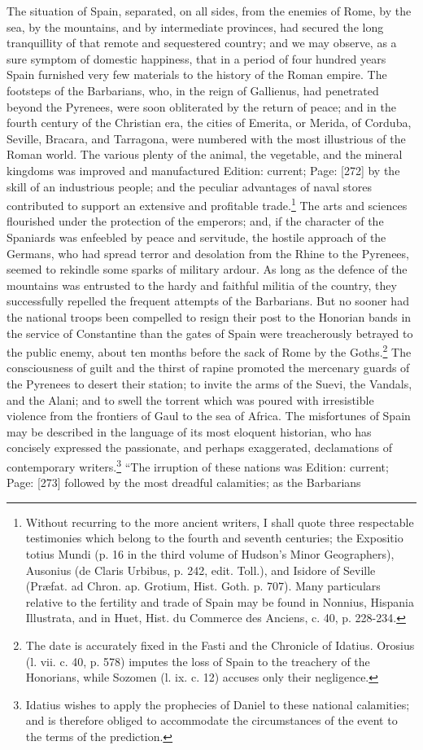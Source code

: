 The situation of Spain, separated, on all sides, from the enemies of Rome, by the sea, by the mountains, and by intermediate provinces, had secured the long tranquillity of that remote and sequestered country; and we may observe, as a sure symptom of domestic happiness, that in a period of four hundred years Spain furnished very few materials to the history of the Roman empire. The footsteps of the Barbarians, who, in the reign of Gallienus, had penetrated beyond the Pyrenees, were soon obliterated by the return of peace; and in the fourth century of the Christian era, the cities of Emerita, or Merida, of Corduba, Seville, Bracara, and Tarragona, were numbered with the most illustrious of the Roman world. The various plenty of the animal, the vegetable, and the mineral kingdoms was improved and manufactured Edition: current; Page: [272] by the skill of an industrious people; and the peculiar advantages of naval stores contributed to support an extensive and profitable trade.\footnote{Without recurring to the more ancient writers, I shall quote three respectable testimonies which belong to the fourth and seventh centuries; the Expositio totius Mundi (p. 16 in the third volume of Hudson\texthebrew{}’s Minor Geographers), Ausonius (de Claris Urbibus, p. 242, edit. Toll.), and Isidore of Seville (Præfat. ad Chron. ap. Grotium, Hist. Goth. p. 707). Many particulars relative to the fertility and trade of Spain may be found in Nonnius, Hispania Illustrata, and in Huet, Hist. du Commerce des Anciens, c. 40, p. 228-234.} The arts and sciences flourished under the protection of the emperors; and, if the character of the Spaniards was enfeebled by peace and servitude, the hostile approach of the Germans, who had spread terror and desolation from the Rhine to the Pyrenees, seemed to rekindle some sparks of military ardour. As long as the defence of the mountains was entrusted to the hardy and faithful militia of the country, they successfully repelled the frequent attempts of the Barbarians. But no sooner had the national troops been compelled to resign their post to the Honorian bands in the service of Constantine than the gates of Spain were treacherously betrayed to the public enemy, about ten months before the sack of Rome by the Goths.\footnote{The date is accurately fixed in the Fasti and the Chronicle of Idatius. Orosius (l. vii. c. 40, p. 578) imputes the loss of Spain to the treachery of the Honorians, while Sozomen (l. ix. c. 12) accuses only their negligence.} The consciousness of guilt and the thirst of rapine promoted the mercenary guards of the Pyrenees to desert their station; to invite the arms of the Suevi, the Vandals, and the Alani; and to swell the torrent which was poured with irresistible violence from the frontiers of Gaul to the sea of Africa. The misfortunes of Spain may be described in the language of its most eloquent historian, who has concisely expressed the passionate, and perhaps exaggerated, declamations of contemporary writers.\footnote{Idatius wishes to apply the prophecies of Daniel to these national calamities; and is therefore obliged to accommodate the circumstances of the event to the terms of the prediction.} \texthebrew{“}The irruption of these nations was Edition: current; Page: [273] followed by the most dreadful calamities; as the Barbarians 
